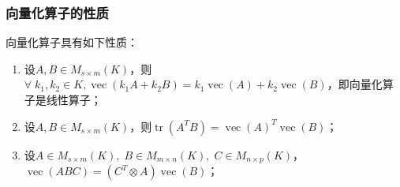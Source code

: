 \subsubsection{向量化算子的性质}
\begin{property}\label{prop:VecOperator}
	向量化算子具有如下性质：
	\begin{enumerate}
		\item 设$A,B\in M_{s\times m}(K)$，则$\forall\;k_1,k_2\in K, \operatorname{vec}(k_1A+k_2B)=k_1\operatorname{vec}(A)+k_2\operatorname{vec}(B)$，即向量化算子是线性算子；
		\item 设$A,B\in M_{s\times m}(K)$，则$\operatorname{tr}(A^TB)=\operatorname{vec}(A)^T\operatorname{vec}(B)$；
		\item 设$A\in M_{s\times m}(K),\;B\in M_{m\times n}(K),\;C\in M_{n\times p}(K)$，$\operatorname{vec}(ABC)=(C^T\otimes A)\operatorname{vec}(B)$；
	\end{enumerate}
\end{property}
